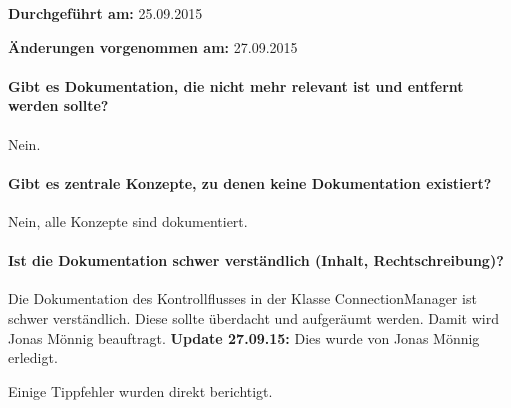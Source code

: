 \textbf{Durchgeführt am:} 25.09.2015

\textbf{Änderungen vorgenommen am:} 27.09.2015

\paragraph{Gibt es Dokumentation, die nicht mehr relevant ist und entfernt werden sollte?}
Nein.

\paragraph{Gibt es zentrale Konzepte, zu denen keine Dokumentation existiert?}
Nein, alle Konzepte sind dokumentiert.

\paragraph{Ist die Dokumentation schwer verständlich (Inhalt, Rechtschreibung)?}
Die Dokumentation des Kontrollflusses in der Klasse ConnectionManager ist schwer verständlich. Diese sollte überdacht und aufgeräumt werden. Damit wird Jonas Mönnig beauftragt. \textbf{Update 27.09.15:} Dies wurde von Jonas Mönnig erledigt.

Einige Tippfehler wurden direkt berichtigt.
